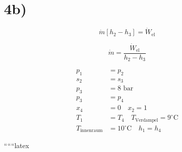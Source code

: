 

\section*{4b)}

\[
\dot{m} \left[ h_2 - h_3 \right] = \dot{W}_{\text{el}}
\]

\[
\dot{m} = \frac{\dot{W}_{\text{el}}}{h_2 - h_3}
\]

\begin{align*}
p_1 &= p_2 \\
s_2 &= s_3 \\
p_3 &= 8 \text{ bar} \\
p_3 &= p_4 \\
x_4 &= 0 \quad x_2 = 1 \\
T_1 &= T_4 \quad T_{\text{Verdampel}} = 9^\circ \text{C} \\
T_{\text{innenraum}} &= 10^\circ \text{C} \quad h_1 = h_4
\end{align*}

``````latex